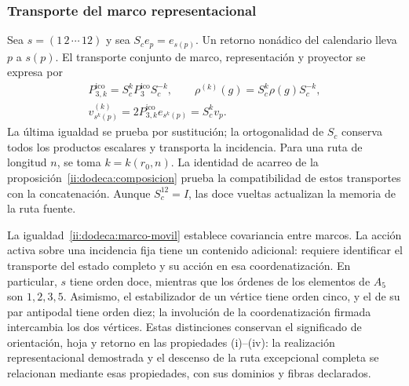 \subsubsection{Transporte del marco representacional}
\label{ii:dodeca:marco}
Sea \(s=(1\,2\,\cdots\,12)\) y sea \(S_ce_p=e_{s(p)}\).
Un retorno nonádico del calendario lleva \(p\) a \(s(p)\). El transporte
conjunto de marco, representación y proyector se expresa por
\begin{equation}
 \begin{gathered}
 P_{3,k}^{\mathrm{ico}}=S_c^kP_3^{\mathrm{ico}}S_c^{-k},\qquad
 \rho^{(k)}(g)=S_c^k\rho(g)S_c^{-k},\\
 v^{(k)}_{s^k(p)}=2P_{3,k}^{\mathrm{ico}}e_{s^k(p)}=S_c^kv_p.
 \end{gathered}
 \label{ii:dodeca:marco-movil}
\end{equation}
La última igualdad se prueba por sustitución; la ortogonalidad de
\(S_c\) conserva todos los productos escalares y transporta la
incidencia. Para una ruta de longitud \(n\), se toma
\(k=k(r_0,n)\). La identidad de acarreo de la
proposición~\ref{ii:dodeca:composicion} prueba la compatibilidad de
estos transportes con la concatenación. Aunque \(S_c^{12}=I\),
las doce vueltas actualizan la memoria de la ruta fuente.

La igualdad~\eqref{ii:dodeca:marco-movil} establece covariancia entre
marcos. La acción activa sobre una incidencia fija tiene un contenido
adicional: requiere identificar el transporte del estado completo y su
acción en esa coordenatización. En particular, \(s\) tiene orden doce, mientras
que los órdenes de los elementos de \(A_5\) son \(1,2,3,5\).
Asimismo, el estabilizador de un vértice tiene orden cinco, y el de su
par antipodal tiene orden diez; la involución de la coordenatización firmada
intercambia los dos vértices. Estas distinciones conservan el significado
de orientación, hoja y retorno en las propiedades (i)--(iv): la
realización representacional demostrada y el descenso de la ruta
excepcional completa se relacionan mediante esas propiedades, con sus
dominios y fibras declarados.
